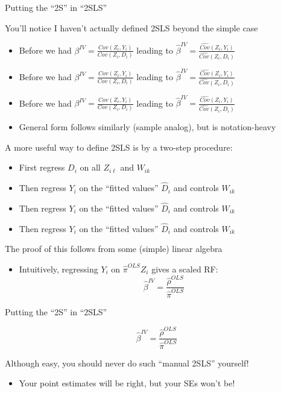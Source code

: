 \documentclass{beamer}
\begin{document}
\begin{frame}{Putting the ``2S'' in ``2SLS''}

You'll notice I haven't actually defined 2SLS beyond the simple case
\begin{itemize}
  \item Before we had $\beta^{IV}=\frac{Cov(Z_i,Y_i)}{Cov(Z_i,D_i)}$ leading to $\widehat\beta^{IV}=\frac{\widehat{Cov}(Z_i,Y_i)}{\widehat{Cov}(Z_i,D_i)}$ 
\item Before we had $\beta^{IV}=\frac{Cov(Z_i,Y_i)}{Cov(Z_i,D_i)}$ leading to $\widehat\beta^{IV}=\frac{\widehat{Cov}(Z_i,Y_i)}{\widehat{Cov}(Z_i,D_i)}$ 
  \item Before we had $\beta^{IV}=\frac{Cov(Z_i,Y_i)}{Cov(Z_i,D_i)}$ leading to $\widehat\beta^{IV}=\frac{\widehat{Cov}(Z_i,Y_i)}{\widehat{Cov}(Z_i,D_i)}$ 
  \item General form follows similarly (sample analog), but is notation-heavy
\end{itemize}
\pause

A more useful way to define 2SLS is by a two-step procedure:
\begin{itemize}
  \item First regress $D_i$ on all $Z_{i\ell}$ and $W_{ik}$
  \item Then regress $Y_i$ on the ``fitted values'' $\widehat{D}_i$ and controls $W_{ik}$ 
\item Then regress $Y_i$ on the ``fitted values'' $\widehat{D}_i$ and controls $W_{ik}$ 
  \item Then regress $Y_i$ on the ``fitted values'' $\widehat{D}_i$ and controls $W_{ik}$ 
\end{itemize}
\pause

The proof of this follows from some (simple) linear algebra 
\begin{itemize}
  \item Intuitively, regressing $Y_i$ on $\widehat{\pi}^{OLS}Z_i$ gives a scaled RF: 
  $$\widehat\beta^{IV}=\frac{\widehat{\rho}^{OLS}}{\widehat{\pi}^{OLS}}$$
\end{itemize}
\end{frame}

\begin{frame}{Putting the ``2S'' in ``2SLS''}

$$\widehat\beta^{IV}=\frac{\widehat{\rho}^{OLS}}{\widehat{\pi}^{OLS}}$$

\medskip
Although easy, you should never do such ``manual 2SLS'' yourself!
\begin{itemize}
\item Your point estimates will be right, but your SEs won't be!
\end{itemize}
\end{frame}
\end{document}

